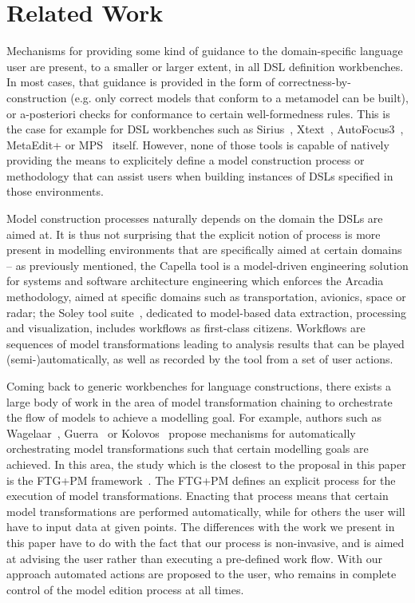 \section{Related Work}
\label{sec:related_work}
 \vspace{-.3cm}
Mechanisms for providing some kind of guidance to the domain-specific
language user are present, to a smaller or larger extent, in all DSL definition
workbenches. In most cases, that guidance is provided in the form of
correctness-by-construction (e.g. only correct models that conform to a
metamodel can be built), or a-posteriori checks for conformance to certain
well-formedness rules. This is the case for example for DSL workbenches such as
Sirius~\cite{DBLP:conf/asplos/HauswaldLZLRKDM15},
Xtext~\cite{DBLP:conf/oopsla/EysholdtB10}, AutoFocus3~\cite{AF315},
MetaEdit+\cite{DBLP:conf/sle/Tolvanen16} or MPS~\cite{DBLP:conf/pppj/PechSV13}
itself. However, none of those tools is capable of natively providing the means
to explicitely define a model construction process or methodology that can
assist users when building instances of DSLs specified in those environments.

Model construction processes naturally depends on the domain the DSLs are aimed
at. It is thus not surprising that the explicit notion of process is more
present in modelling environments that are specifically aimed at certain domains
-- as previously mentioned, the Capella tool is a model-driven engineering
solution for systems and software architecture engineering which enforces the
Arcadia~\cite{DBLP:conf/syscon/BonnetVEN16} methodology, aimed at specific
domains such as transportation, avionics, space or radar; the Soley tool
suite~\cite{soley}, dedicated to model-based data extraction, processing and
visualization, includes workflows as first-class citizens.
Workflows are sequences of model transformations leading to analysis results
that can be played (semi-)automatically, as well as recorded by the tool from a
set of user actions.

Coming back to generic workbenches for language constructions, there exists a
large body of work in the area of model transformation chaining to orchestrate
the flow of models to achieve a modelling goal. For example, authors such as
Wagelaar~\cite{wagelaar2006blackbox}, Guerra~\cite{transml} or
Kolovos~\cite{Kolovos2008} propose mechanisms for automatically orchestrating
model transformations such that certain modelling goals are achieved. In this
area, the study which is the closest to the proposal in this paper is the FTG+PM
framework~\cite{DBLP:conf/sdl/LucioMDVJ13,MustafizDLV12}. The FTG+PM defines an
explicit process for the execution of model transformations.
Enacting that process means that certain model transformations are performed
automatically, while for others the user will have to input data at given
points. The differences with the work we present in this paper have to do with
the fact that our process is non-invasive, and is aimed at advising the user
rather than executing a pre-defined work flow. With our approach automated
actions are proposed to the user, who remains in complete control of the model
edition process at all times.

